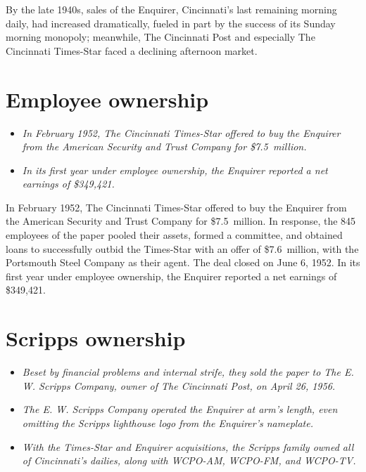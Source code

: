 By the late 1940s, sales of the Enquirer, Cincinnati's last remaining
morning daily, had increased dramatically, fueled in part by the success
of its Sunday morning monopoly; meanwhile, The Cincinnati Post and
especially The Cincinnati Times-Star faced a declining afternoon market.

\section{Employee ownership}\label{employee-ownership}

\begin{itemize}
\item
  \emph{In February 1952, The Cincinnati Times-Star offered to buy the
  Enquirer from the American Security and Trust Company for
  \$7.5~million.}
\item
  \emph{In its first year under employee ownership, the Enquirer
  reported a net earnings of \$349,421.}
\end{itemize}

In February 1952, The Cincinnati Times-Star offered to buy the Enquirer
from the American Security and Trust Company for \$7.5~million. In
response, the 845 employees of the paper pooled their assets, formed a
committee, and obtained loans to successfully outbid the Times-Star with
an offer of \$7.6~million, with the Portsmouth Steel Company as their
agent. The deal closed on June 6, 1952. In its first year under employee
ownership, the Enquirer reported a net earnings of \$349,421.

\section{Scripps ownership}\label{scripps-ownership}

\begin{itemize}
\item
  \emph{Beset by financial problems and internal strife, they sold the
  paper to The E. W. Scripps Company, owner of The Cincinnati Post, on
  April 26, 1956.}
\item
  \emph{The E. W. Scripps Company operated the Enquirer at arm's length,
  even omitting the Scripps lighthouse logo from the Enquirer's
  nameplate.}
\item
  \emph{With the Times-Star and Enquirer acquisitions, the Scripps
  family owned all of Cincinnati's dailies, along with WCPO-AM, WCPO-FM,
  and WCPO-TV.}
\end{itemize}

